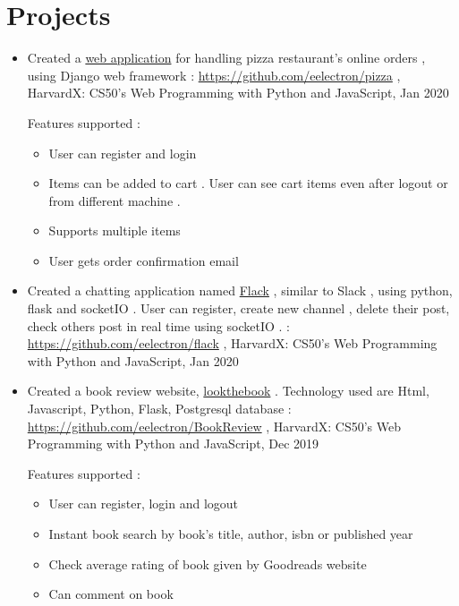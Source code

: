 \documentclass[a4paper,10pt]{article}
\begin{document}
	\section{Projects}
	\begin{itemize}
				
				\item Created a \href{https://pizzacs50w.herokuapp.com/}{web application} for handling pizza restaurant's online orders , using Django web framework : \url{https://github.com/eelectron/pizza} , HarvardX: CS50's Web Programming with Python and JavaScript, Jan 2020
					
					Features supported :
					\begin{itemize}
						\item User can register and login
						\item Items can be added to cart . User can see cart items even after logout or from different machine .
						\item Supports multiple items
						\item User gets order confirmation email
					\end{itemize}
					
				\item Created a chatting application named \href{https://flackthechat.herokuapp.com}{Flack} , similar to Slack , using python, flask and socketIO . User can register, create new channel , delete their post, check others post in real time using socketIO . : \url{https://github.com/eelectron/flack} , HarvardX: CS50's Web Programming with Python and JavaScript, Jan 2020
				
				\item Created a book review website, \href{http://lookthebook.herokuapp.com}{lookthebook} . Technology used are Html, Javascript, Python, Flask, Postgresql database : \url{https://github.com/eelectron/BookReview}  , HarvardX: CS50's Web Programming with Python and JavaScript, Dec 2019
				
				Features supported :
				\begin{itemize}
					\item User can register, login and logout
					\item Instant book search by book's title, author, isbn or published year
					\item Check average rating of book given by Goodreads website
					\item Can comment  on book 
				\end{itemize}
				

\end{itemize}
\end{document}
